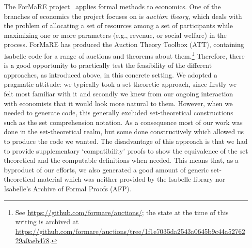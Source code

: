 \documentclass[
]{llncs}
\newcommand{\afp}{AFP}
\newcommand{\att}{ATT}
\newcommand{\junction}{compatibility}
\newcommand{\I}{Isabelle}
\newcommand{\fo}{ForMaRE}
\newcommand{\query}[1]{\marginnote{\raggedright\footnotesize\itshape\hrule\smallskip{#1}\smallskip\hrule}}\renewcommand{\query}[1]{} \newcommand{\rnote}[1]{\query{#1}}
\newcommand{\lnote}[1]{\reversemarginpar\query{#1}\normalmarginpar}
\begin{document}
The \fo{} project~\cite{LRK:FormareProject13:short} applies formal methods to economics.
\lnote{MC: Added this sentence for reviewer 1.}
One of the branches of economics the project focuses on is \emph{auction theory}, which deals with the problem of allocating a set of resources among a set of participants while maximizing one or more parameters (e.g., revenue, or social welfare) in the process.
\fo{} has produced the Auction Theory Toolbox (\att{}), containing \I{} code for a range of auctions and theorems about them.\footnote{See \url{https://github.com/formare/auctions/}; 
the state at the time of this writing is archived at \url{https://github.com/formare/auctions/tree/1f1e7035da2543a0645b9c44a5276229a0aeb478}.
}  
Therefore, there is a good opportunity to practically test the feasibility of the different approaches, as introduced above, in this concrete setting.
We adopted a pragmatic attitude: we typically took a set theoretic approach, since firstly we felt most familiar with it and secondly we knew from our ongoing interaction with economists that it would look more natural to them. However, when we needed to generate code, this generally excluded set-theoretical constructions such as the set comprehension notation.
As a consequence most of our work was done in the set-theoretical realm, but some done constructively which allowed us to produce the code we wanted. 
The disadvantage of this approach is that we had to provide supplementary `\junction{}' proofs to show the equivalence of the set theoretical and the computable definitions when needed.
This means that, as a byproduct of our efforts, we also generated a good amount of generic set-theoretical material which was neither provided by the \I{} library nor \I{}'s Archive of Formal Proofs (\afp{})\cite{afp}.
\end{document}
